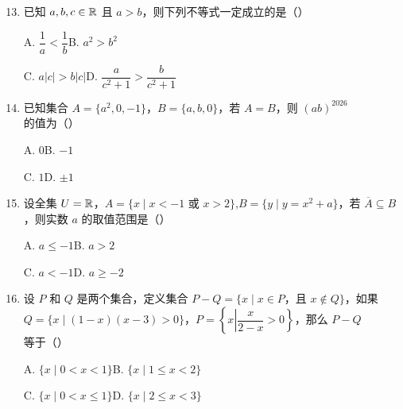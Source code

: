 \documentclass[a4paper,11pt]{article}
\begin{document}
\begin{enumerate}
\setcounter{enumi}{12}

\item 已知 $a,b,c\in\mathbb{R}$ 且 $a>b$，则下列不等式一定成立的是\mbox{（\quad）}

\keepwithprev
A. $\dfrac1a<\dfrac1b$\qquad B. $a^2>b^2$

C. $a|c|>b|c|$\qquad D. $\dfrac a{c^2+1}>\dfrac b{c^2+1}$

\ifanswer
\solbegin
{}
\solend
\fi

\item 已知集合 $A=\{a^2,0,-1\}$，$B=\{a,b,0\}$，若 $A=B$，则 $(ab)^{2026}$ 的值为\mbox{（\quad）}

\keepwithprev
A. $0$\qquad B. $-1$

C. $1$\qquad D. $\pm1$

\ifanswer
\solbegin
{}
\solend
\fi

\item 设全集 $U=\mathbb{R}$，$A=\{x\mid x<-1\text{ 或 }x>2\}$,$B=\{y\mid y=x^2+a\}$，若 $\overline A\subseteq B$，则实数 $a$ 的取值范围是\mbox{（\quad）}

\keepwithprev
A. $a\leqslant-1$\qquad B. $a>2$

C. $a<-1$\qquad D. $a\geqslant-2$

\ifanswer
\solbegin
{}
\solend
\fi

\item 设 $P$ 和 $Q$ 是两个集合，定义集合 $P-Q=\{x\mid x\in P$，且 $x\notin Q\}$，如果 $Q=\{x\mid(1-x)(x-3)>0\}$，$P=\left\{x\left|\dfrac x{2-x}>0\right.\right\}$，那么 $P-Q$ 等于\mbox{（\quad）}

\keepwithprev
A. $\{x\mid0<x<1\}$\qquad B. $\{x\mid1\leqslant x<2\}$

C. $\{x\mid0<x\leqslant1\}$\qquad D. $\{x\mid2\leqslant x<3\}$

\ifanswer
\solbegin
{}
\solend
\fi

\end{enumerate}
\end{document}
